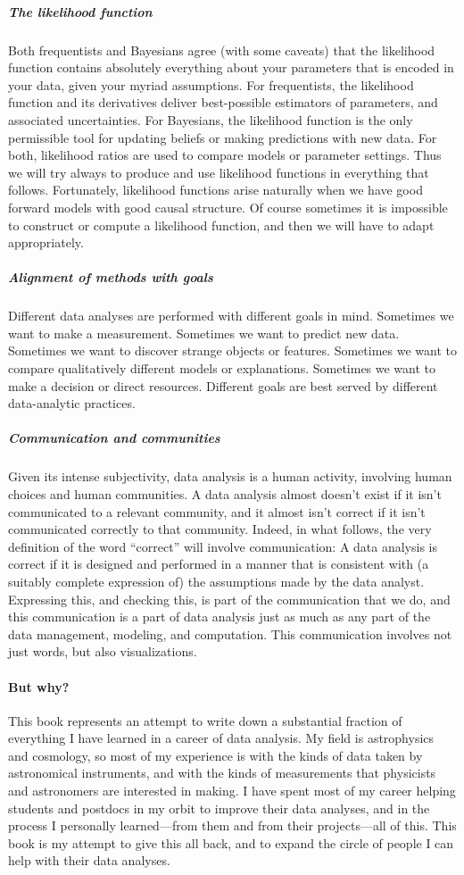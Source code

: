 \subparagraph{The likelihood function}
Both frequentists and Bayesians agree (with some caveats) that the likelihood function contains absolutely everything about your parameters that is encoded in your data, given your myriad assumptions.
For frequentists, the likelihood function and its derivatives deliver best-possible estimators of parameters, and associated uncertainties.
For Bayesians, the likelihood function is the only permissible tool for updating beliefs or making predictions with new data.
For both, likelihood ratios are used to compare models or parameter settings.
Thus we will try always to produce and use likelihood functions in everything that follows.
Fortunately, likelihood functions arise naturally when we have good forward models with good causal structure.
Of course sometimes it is impossible to construct or compute a likelihood function, and then we will have to adapt appropriately.

\subparagraph{Alignment of methods with goals}
Different data analyses are performed with different goals in mind.
Sometimes we want to make a measurement.
Sometimes we want to predict new data.
Sometimes we want to discover strange objects or features.
Sometimes we want to compare qualitatively different models or explanations.
Sometimes we want to make a decision or direct resources.
Different goals are best served by different data-analytic practices.

\subparagraph{Communication and communities}
Given its intense subjectivity, data analysis is a human activity, involving human choices and human communities.
A data analysis almost doesn't exist if it isn't communicated to a relevant community, and it almost isn't correct if it isn't communicated correctly to that community.
Indeed, in what follows, the very definition of the word ``correct'' will involve communication:
A data analysis is correct if it is designed and performed in a manner that is consistent with (a suitably complete expression of) the assumptions made by the data analyst.
Expressing this, and checking this, is part of the communication that we do, and this communication is a part of data analysis just as much as any part of the data management, modeling, and computation.
This communication involves not just words, but also visualizations.

\paragraph{But why?}
This book represents an attempt to write down a substantial fraction of everything I have learned in a career of data analysis.
My field is astrophysics and cosmology, so most of my experience is with the kinds of data taken by astronomical instruments, and with the kinds of measurements that physicists and astronomers are interested in making.
I have spent most of my career helping students and postdocs in my orbit to improve their data analyses, and in the process I personally learned---from them and from their projects---all of this.
This book is my attempt to give this all back, and to expand the circle of people I can help with their data analyses.

